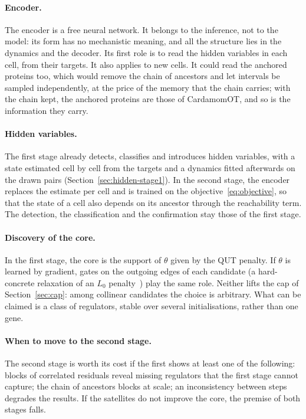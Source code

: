 \documentclass[a4paper, 11pt]{article}
\theoremstyle{plain}
\theoremstyle{remark}
\begin{document}
\paragraph{Encoder.} The encoder is a free neural network. It belongs to the inference, not to the model: its form has no mechanistic meaning, and all the structure lies in the dynamics and the decoder. Its first role is to read the hidden variables in each cell, from their targets. It also applies to new cells. It could read the anchored proteins too, which would remove the chain of ancestors and let intervals be sampled independently, at the price of the memory that the chain carries; with the chain kept, the anchored proteins are those of CardamomOT, and so is the information they carry.

\paragraph{Hidden variables.} The first stage already detects, classifies and introduces hidden variables, with a state estimated cell by cell from the targets and a dynamics fitted afterwards on the drawn pairs (Section~\ref{sec:hidden-stage1}). In the second stage, the encoder replaces the estimate per cell and is trained on the objective~\eqref{eq:objective}, so that the state of a cell also depends on its ancestor through the reachability term. The detection, the classification and the confirmation stay those of the first stage.

\paragraph{Discovery of the core.} In the first stage, the core is the support of $\theta$ given by the QUT penalty. If $\theta$ is learned by gradient, gates on the outgoing edges of each candidate (a hard-concrete relaxation of an $L_0$ penalty~\cite{louizos2018learning}) play the same role. Neither lifts the cap of Section~\ref{sec:cap}: among collinear candidates the choice is arbitrary. What can be claimed is a class of regulators, stable over several initialisations, rather than one gene.

\paragraph{When to move to the second stage.} The second stage is worth its cost if the first shows at least one of the following: blocks of correlated residuals reveal missing regulators that the first stage cannot capture; the chain of ancestors blocks at scale; an inconsistency between steps degrades the results. If the satellites do not improve the core, the premise of both stages falls.
\end{document}
